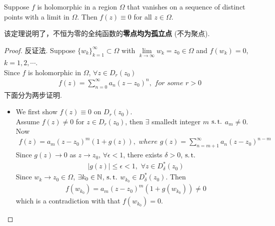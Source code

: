 	\begin{thm}\label{thm 6.3.1}
		Suppose $f$ is holomorphic in a region $\Omega$ that vanishes on a sequence of distinct points with a limit in $\Omega$. Then $f(z) \equiv 0$ for all $z \in \Omega$.
		
		\vspace{1em}
		\begin{rmk}
			该定理说明了，不恒为零的全纯函数的\textbf{零点均为孤立点} (不为聚点).
		\end{rmk}
	
		\vspace{1em}
		\begin{proof}
			反证法. Suppose $\{ w_k \}_{k = 1}^{\infty} \subset \Omega$ with $\underset{k \to \infty}{\lim}{w_k} = z_0 \in \Omega$ and $f(w_k) = 0$, $k = 1 , 2 , \cdots$. \\
			Since $f$ is holomorphic in $\Omega$, $\forall z \in D_{r}(z_0)$
			\begin{align}
				f(z) = \sum_{n = 0}^{\infty}{a_n (z - z_0)^n} , \,\, for \,\, some \,\, r > 0
			\end{align}
			下面分为两步证明.
			\begin{itemize}
				\item We first show $f(z) \equiv 0$ on $D_{r}(z_0)$. \\
				Assume $f(z) \neq 0$ for $z \in D_{r}(z_0)$, then $\exists$ smalledt integer $m$ $\operatorname{s.t.}$ $a_m \neq 0$. Now
				\begin{align}
					f(z) = a_m (z - z_0)^m (1 + g(z)) , \,\, where \,\, g(z) = \sum_{n = m + 1}^{\infty}{a_n (z - z_0)^{n - m}}
				\end{align}
				Since $g(z) \to 0$ as $z \to z_0$, $\forall \epsilon < 1$, there exists $\delta > 0$, $\operatorname{s.t.}$
				\begin{align}
					\left| g(z) \right| \leq \epsilon < 1 , \,\, \forall z \in D_{\delta}^{*}(z_0)
				\end{align}
				Since $w_k \to z_0 \in \Omega$, $\exists k_0 \in \mathbb{N}$, $\operatorname{s.t.}$ $w_{k_0} \in D_{\delta}^{*}(z_0)$. Then
				\begin{align}
					f(w_{k_0}) = a_m (z - z_0)^m (1 + g(w_{k_0})) \neq 0
				\end{align}
				which is a contradiction with that $f(w_{k_0}) = 0$.
				

\end{itemize}
\end{proof}
\end{thm}
